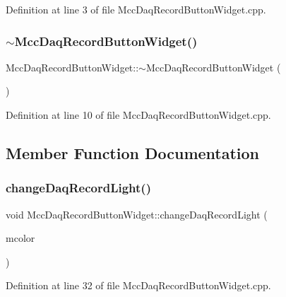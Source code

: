 Definition at line 3 of file Mcc\+Daq\+Record\+Button\+Widget.\+cpp.

\mbox{\label{class_mcc_daq_record_button_widget_a34199ccdab0d187434826a9291fbf4ba}} 
\subsubsection{\texorpdfstring{$\sim$\+Mcc\+Daq\+Record\+Button\+Widget()}{~MccDaqRecordButtonWidget()}}
{\footnotesize\ttfamily Mcc\+Daq\+Record\+Button\+Widget\+::$\sim$\+Mcc\+Daq\+Record\+Button\+Widget (\begin{DoxyParamCaption}{ }\end{DoxyParamCaption})}



Definition at line 10 of file Mcc\+Daq\+Record\+Button\+Widget.\+cpp.



\subsection{Member Function Documentation}
\mbox{\label{class_mcc_daq_record_button_widget_af756c9d1918c871e907a032f3059e65d}} 
\subsubsection{\texorpdfstring{change\+Daq\+Record\+Light()}{changeDaqRecordLight()}}
{\footnotesize\ttfamily void Mcc\+Daq\+Record\+Button\+Widget\+::change\+Daq\+Record\+Light (\begin{DoxyParamCaption}\item[{Q\+Color}]{mcolor }\end{DoxyParamCaption})}



Definition at line 32 of file Mcc\+Daq\+Record\+Button\+Widget.\+cpp.

